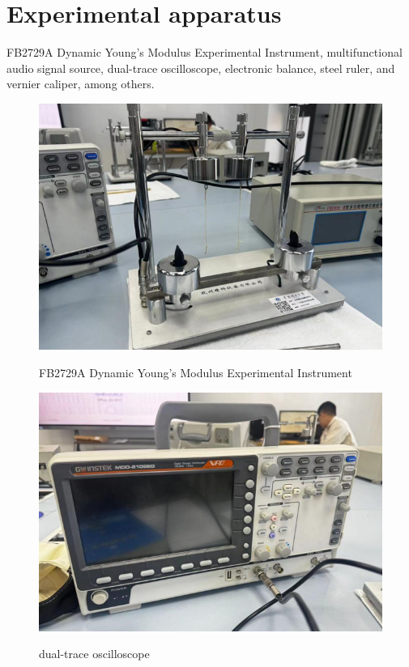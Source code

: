 \documentclass[UTF8]{article}
\begin{document}
	\section{Experimental apparatus}
    FB2729A Dynamic Young's Modulus Experimental Instrument, multifunctional audio signal source, dual-trace oscilloscope, electronic balance, steel ruler, and vernier caliper, among others.
    
	 \begin{figure}[H]
	             \begin{minipage}[t]{0.5\linewidth}
	                \centering
	                \includegraphics[clip,scale=0.5,trim={0 0 0 0}]{fig/fig1.png}
	                \label{figure.11}
	                \caption{FB2729A Dynamic Young's Modulus Experimental Instrument}
	             \end{minipage}
	             \begin{minipage}[t]{0.5\linewidth}
	                \centering
	                \includegraphics[clip,scale=0.5,trim={0 0 0 0}]{fig/fig2.png}
	                \label{figure.12}
	                \caption{dual-trace oscilloscope}
	             \end{minipage}   	  
	          \end{figure}    
    
\end{document}
